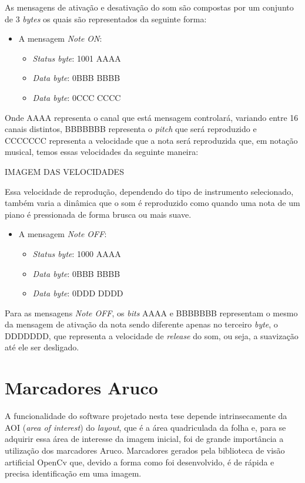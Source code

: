 \documentclass[12pt]{report}
\begin{document}
As mensagens de ativação e desativação do som são compostas por um conjunto de 3 {\it bytes} os quais são representados da seguinte forma:

\begin{itemize}
  \item A mensagem {\it Note ON}:
  \begin{itemize}
    \item {\it Status byte}: 1001 AAAA
    \item {\it Data byte}: 0BBB BBBB
    \item {\it Data byte}: 0CCC CCCC
  \end{itemize}
\end{itemize}

Onde AAAA representa o canal que está mensagem controlará, variando entre 16 canais distintos, BBBBBBB representa o {\it pitch} que será reproduzido e CCCCCCC representa a velocidade que a nota será reproduzida que, em notação musical, temos essas velocidades da seguinte maneira:

IMAGEM DAS VELOCIDADES

Essa velocidade de reprodução, dependendo do tipo de instrumento selecionado, também varia a dinâmica que o som é reproduzido como quando uma nota de um piano é pressionada de forma brusca ou mais suave.

\begin{itemize}
  \item A mensagem {\it Note OFF}:
  \begin{itemize}
    \item {\it Status byte}: 1000 AAAA
    \item {\it Data byte}: 0BBB BBBB
    \item {\it Data byte}: 0DDD DDDD
  \end{itemize}
\end{itemize}

Para as mensagens {\it Note OFF}, os {\it bits} AAAA e BBBBBBB representam o mesmo da mensagem de ativação da nota sendo diferente apenas no terceiro {\it byte}, o DDDDDDD, que representa a velocidade de {\it release} do som, ou seja, a suavização até ele ser desligado.

\section{Marcadores Aruco}

A funcionalidade do software projetado nesta tese depende intrinsecamente da AOI ({\it area of interest}) do {\it layout}, que é a área quadriculada da folha e, para se adquirir essa área de interesse da imagem inicial, foi de grande importância a utilização dos marcadores Aruco. Marcadores gerados pela biblioteca de visão artificial OpenCv que, devido a forma como foi desenvolvido, é de rápida e precisa identificação em uma imagem.
\end{document}
